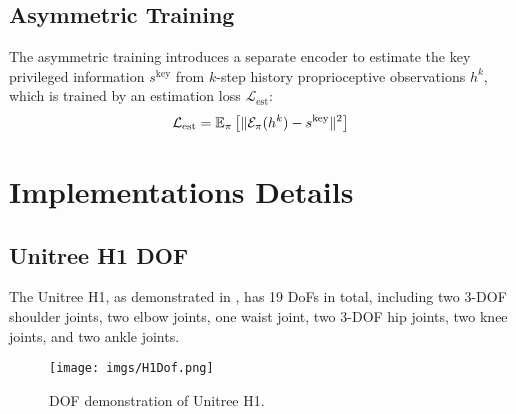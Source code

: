 
\subsection{Asymmetric Training}
The asymmetric training introduces a separate encoder to estimate the key privileged information $s^{\text{key}}$ from $k$-step history proprioceptive observations $h^{k}$, which is trained by an estimation loss $\mathcal{L}_{\text{est}}$: 
\begin{equation}
    \mathcal{L}_{\text{est}} = \mathbb{E}_\pi\left[\|\mathcal E_{\pi}(h^k) - s^{\text{key}}\|^2\right]
\label{eq:asym_detail}
\end{equation}

\section{Implementations Details}

\subsection{Unitree H1 DOF}
The Unitree H1, as demonstrated in , has 19 DoFs in total, including two 3-DOF shoulder joints,
two elbow joints, one waist joint, two 3-DOF hip joints, two
knee joints, and two ankle joints. 
\begin{figure}
    \centering
    \texttt{[image: imgs/H1Dof.png]}
    \caption{\small DOF demonstration of Unitree H1.}
    \label{fig:H1-dof}
\end{figure}

